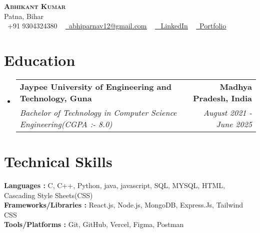 \documentclass[letterpaper,11pt]{article}
\makeatletter
\newcommand{\resumeSubheading}[4]{
  \vspace{-2pt}\item
	\begin{tabular*}{1.0\textwidth}[t]{l@{\extracolsep{\fill}}r}
  	\textbf{#1} & \textbf{\small #2} \\
  	\textit{\small#3} & \textit{\small #4} \\
	\end{tabular*}\vspace{-7pt}
}
\newcommand{\resumeSubHeadingListStart}{\begin{itemize}[leftmargin=0.0in, label={}]}
\newcommand{\resumeSubHeadingListEnd}{\end{itemize}}
\makeatother
\begin{document}
 

\begin{center}
	{\Huge  {\scshape \textbf{Abhikant Kumar}}} \\ \vspace{3pt}
	Patna, Bihar  \\ \vspace{2pt}
	\small \raisebox{-0.1\height}\faPhone\ +91 9304324380 ~ \href{mailto:x@gmail.com}{\raisebox{-0.2\height}\faEnvelope\  \underline{abhiparnav12@gmail.com}} ~
	\href{https://linkedin.com/in//}{\raisebox{-0.2\height}\faLinkedin\ \underline{ LinkedIn}} ~
   \href{https://abhikant-portfolio.netlify.app/}{\raisebox{-0.2\height}\faGlobe\ \underline{Portfolio}}
\end{center}


\section{Education}
  \resumeSubHeadingListStart
	\resumeSubheading
  	{Jaypee University of Engineering and Technology, Guna}{Madhya Pradesh, India}
  	{Bachelor of Technology in Computer Science Engineering(CGPA  :-  8.0)}{August 2021 - June 2025}
   \vspace{1pt}
  \resumeSubHeadingListEnd

  
 
\section{Technical Skills }
 \begin{itemize}[leftmargin=0.15in, label={}]
	\small{\item{
 	\textbf{Languages : }{ C, C++, Python, java, javascript, SQL, MYSQL, HTML, Cascading Style Sheets(CSS) } \\  \vspace{4pt}
        \textbf{Frameworks/Libraries :}  {React.js, Node.js, MongoDB, Express.Js, Tailwind CSS } \\  \vspace{4pt}
        \textbf{Tools/Platforms :}  {Git, GitHub, Vercel, Figma, Postman} \\
	}}
 \end{itemize}
 \vspace{-11pt}



\end{document}
